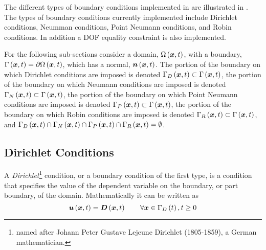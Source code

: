 The different types of boundary conditions implemented in \OpenCMISS are illustrated in . The types of boundary conditions currently implemented include Dirichlet conditions, Neumman conditions, Point Neumann conditions, and Robin conditions. In addition a DOF equality constraint is also implemented. 


For the following sub-sections consider a domain, $ \Omega\left(  \boldsymbol{x} ,t \right) $, with a boundary, $ \Gamma\left(  \boldsymbol{x} ,t \right) = \partial{\ensuremath{ \Omega\left(  \boldsymbol{x} ,t \right) }} $, which has a normal, $  \boldsymbol{n} \left(  \boldsymbol{x} ,t \right) $. The portion of the boundary on which Dirichlet conditions are imposed is denoted $ \Gamma_{D}\left(  \boldsymbol{x} ,t \right) \subset \Gamma\left(  \boldsymbol{x} ,t \right) $, the portion of the boundary on which Neumann conditions are imposed is denoted $ \Gamma_{N}\left(  \boldsymbol{x} ,t \right) \subset \Gamma\left(  \boldsymbol{x} ,t \right) $, the portion of the boundary on which Point Neumann conditions are imposed is denoted $ \Gamma_{P}\left(  \boldsymbol{x} ,t \right) \subset \Gamma\left(  \boldsymbol{x} ,t \right) $, the portion of the boundary on which Robin conditions are imposed is denoted $ \Gamma_{R}\left(  \boldsymbol{x} ,t \right) \subset \Gamma\left(  \boldsymbol{x} ,t \right) $, and $ \Gamma_{D}\left(  \boldsymbol{x} ,t \right) \cap \Gamma_{N}\left(  \boldsymbol{x} ,t \right) \cap \Gamma_{P}\left(  \boldsymbol{x} ,t \right) \cap \Gamma_{R}\left(  \boldsymbol{x} ,t \right) =\emptyset$.

\subsection{Dirichlet Conditions}
\label{subsec:DevelopersDirichletConditions}

A \emph{Dirichlet}\footnote{named after Johann Peter Gustave Lejeune
Dirichlet (1805-1859), a German mathematician.} condition, or a boundary condition of the first
type, is a condition that specifies the value of the dependent
variable on the boundary, or part boundary, of the
domain. Mathematically it can be written as
\begin{equation}
 \fnof{\vectr{u}}{\vectr{x},t}=\fnof{\vectr{D}}{\vectr{x},t}\qquad\forall\vectr{x}\in\fnof{\Gamma_{D}}{t},t\geq 0
 \label{eqn:DevelopersDirichletCondition}
\end{equation}

